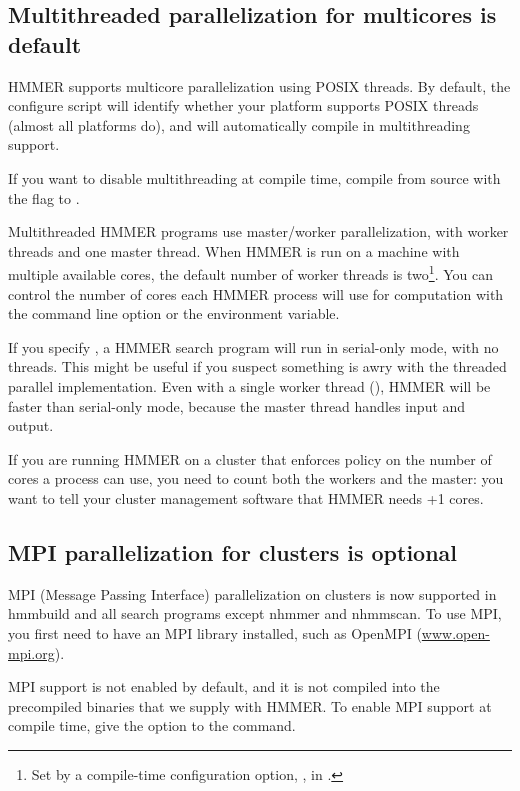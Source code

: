 \subsection{Multithreaded parallelization for multicores is default}

HMMER supports multicore parallelization using POSIX threads. By
default, the configure script will identify whether your platform
supports POSIX threads (almost all platforms do), and will
automatically compile in multithreading support.

If you want to disable multithreading at compile time, compile from
source with the  flag to .

Multithreaded HMMER programs use master/worker parallelization, with
 worker threads and one master thread. When HMMER is run on
a machine with multiple available cores, the default number of worker
threads is two\footnote{Set by a compile-time configuration option,
  , in .}. You can control the
number of cores each HMMER process will use for computation with the
 command line option or the 
environment variable.

If you specify , a HMMER search program will run in
serial-only mode, with no threads. This might be useful if you suspect
something is awry with the threaded parallel implementation.  Even
with a single worker thread (), HMMER will be faster
than serial-only mode, because the master thread handles input and
output.

If you are running HMMER on a cluster that enforces policy on the
number of cores a process can use, you need to count both the workers
and the master: you want to tell your cluster management software that
HMMER needs +1 cores.


\subsection{MPI parallelization for clusters is optional}

MPI (Message Passing Interface) parallelization on clusters is now
supported in hmmbuild and all search programs except nhmmer and 
nhmmscan. To use MPI, you first need to have an MPI library installed, 
such as OpenMPI (\url{www.open-mpi.org}). 

MPI support is not enabled by default, and it is not compiled into the
precompiled binaries that we supply with HMMER. To enable MPI support
at compile time, give the  option to the
 command.

